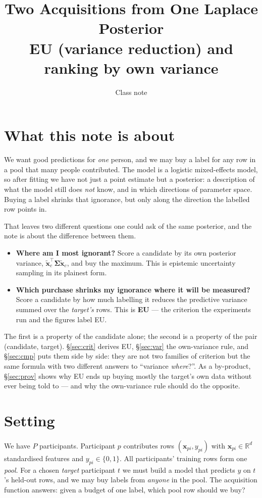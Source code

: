 \documentclass[11pt]{article}
\title{Two Acquisitions from One Laplace Posterior\\[2pt]
\large EU (variance reduction) and ranking by own variance}
\author{Class note}
\date{}
\newcommand{\bx}{\bm{x}}
\newcommand{\bS}{\bm{\Sigma}}
\begin{document}
\maketitle

\section*{What this note is about}

We want good predictions for \emph{one} person, and we may buy a label for any row in a pool
that many people contributed. The model is a logistic mixed-effects model, so after fitting we
have not just a point estimate but a posterior: a description of what the model still does
\emph{not} know, and in which directions of parameter space. Buying a label shrinks that
ignorance, but only along the direction the labelled row points in.

That leaves two different questions one could ask of the same posterior, and the note is about
the difference between them.
\begin{itemize}
  \item \textbf{Where am I most ignorant?} Score a candidate by its own posterior variance,
        $\tilde{\bx}_c^{\!\top}\bS\tilde{\bx}_c$, and buy the maximum. This is epistemic
        uncertainty sampling in its plainest form.
  \item \textbf{Which purchase shrinks my ignorance where it will be measured?} Score a
        candidate by how much labelling it reduces the predictive variance summed over the
        \emph{target's} rows. This is \textbf{EU} --- the criterion the experiments run and the
        figures label EU.
\end{itemize}
The first is a property of the candidate alone; the second is a property of the pair
(candidate, target). \S\ref{sec:crit} derives EU, \S\ref{sec:var} the own-variance rule, and
\S\ref{sec:cmp} puts them side by side: they are not two families of criterion but the same
formula with two different answers to ``variance \emph{where}?''. As a by-product, \S\ref{sec:prov}
shows why EU ends up buying mostly the target's own data without ever being told to --- and why
the own-variance rule should do the opposite.

\section{Setting}

We have $P$ participants. Participant $p$ contributes rows $(\bx_{pi}, y_{pi})$ with
$\bx_{pi}\in\mathbb{R}^{d}$ standardised features and $y_{pi}\in\{0,1\}$. All participants'
training rows form one \emph{pool}. For a chosen \emph{target} participant $t$ we must build a
model that predicts $y$ on $t$'s held-out rows, and we may buy labels from \emph{anyone} in the
pool. The acquisition function answers: given a budget of one label, which pool row should we
buy?
\end{document}
